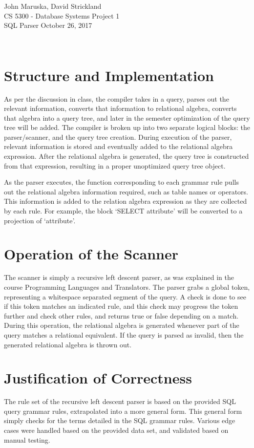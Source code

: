 \documentclass[]{article}
\begin{document}
	\noindent John Maruska, David Strickland \\
	CS 5300 - Database Systems \hfill Project 1 \\
	SQL Parser \hfill October 26, 2017
	
	\noindent\hrulefill \\
	\doublespacing
	
	\section{Structure and Implementation}
	
	As per the discussion in class, the compiler takes in a query, parses out the relevant information, converts that information to relational algebra, converts that algebra into a query tree, and later in the semester optimization of the query tree will be added. The compiler is broken up into two separate logical blocks: the parser/scanner, and the query tree creation. During execution of the parser, relevant information is stored and eventually added to the relational algebra expression. After the relational algebra is generated, the query tree is constructed from that expression, resulting in a proper unoptimized query tree object.
	
	As the parser executes, the function corresponding to each grammar rule pulls out the relational algebra information required, such as table names or operators. This information is added to the relation algebra expression as they are collected by each rule. For example, the block `SELECT attribute' will be converted to a projection of `attribute'. 
	
	\section{Operation of the Scanner}
	
	The scanner is simply a recursive left descent parser, as was explained in the course Programming Languages and Translators. The parser grabs a global token, representing a whitespace separated segment of the query. A check is done to see if this token matches an indicated rule, and this check may progress the token further and check other rules, and returns true or false depending on a match. During this operation, the relational algebra is generated whenever part of the query matches a relational equivalent. If the query is parsed as invalid, then the generated relational algebra is thrown out. 
	
	\section{Justification of Correctness}
	
	The rule set of the recursive left descent parser is based on the provided SQL query grammar rules, extrapolated into a more general form. This general form simply checks for the terms detailed in the SQL grammar rules.  Various edge cases were handled based on the provided data set, and validated based on manual testing. 
	
	
	
\end{document}
